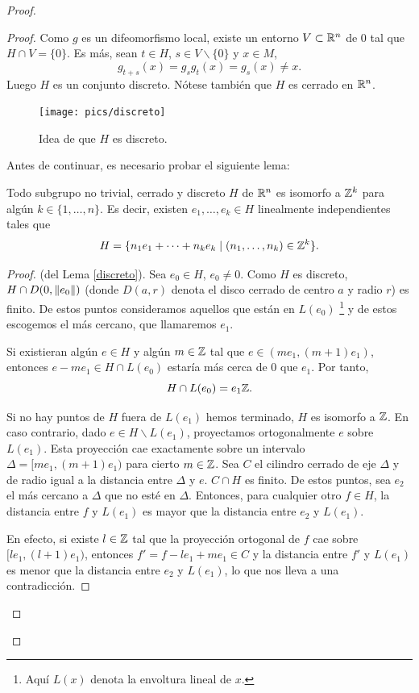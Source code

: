 \begin{proof}
\begin{proof}
 Como $g$ es un difeomorfismo local, existe un entorno $V\subset \mathbb{R}^n$ de 0 tal que $H\cap V= \{0\}$. Es más, sean $t\in H$, $s\in V\backslash \{0\}$ y $x\in M$, 
  \[
    g_{t+s}(x)=g_sg_t(x)=g_s(x)\neq x.
  \]
  Luego $H$ es un conjunto discreto. Nótese también que $H$ es cerrado en $\mathbb{R}^n$.
  \begin{figure}[h]
    \centering
    \texttt{[image: pics/discreto]}
    \caption{\small Idea de que $H$ es discreto.}
    \label{fig:discreto}
  \end{figure}

  Antes de continuar, es necesario probar el siguiente lema:
  \begin{lema}\label{discreto}
    Todo subgrupo no trivial, cerrado y discreto $H$ de $\mathbb{R}^n$ es isomorfo a $\mathbb{Z}^k$ para algún $k\in\{1,\dots,n\}$. Es decir, existen $e_1,\dots,e_k \in H$ linealmente independientes tales que 
    \[
      H=\{n_1e_1+\cdots+n_ke_k \mid (n_1,\dots,n_k) \in \mathbb{Z}^k \}.
    \]
  \end{lema}
  \begin{proof}(del Lema \ref{discreto}). 
  Sea $e_0 \in H$, $e_0 \neq 0$. Como $H$ es discreto, $H \cap D(0,\left\Vert e_0\right\Vert)$ (donde $D(a,r)$ denota el disco cerrado de centro $a$ y radio $r$) es finito. De estos puntos consideramos aquellos que están en $L(e_0)$ \footnote{Aquí $L(x)$ denota la envoltura lineal de $x$.} y de estos escogemos el más cercano, que llamaremos $e_1$. 
  
  Si existieran algún $e \in H$ y algún $m \in \mathbb{Z}$ tal que $e \in (me_1,(m+1)e_1)$, entonces $e-me_1 \in H \cap L(e_0)$ estaría más cerca de 0 que $e_1$. Por tanto, 
  \[
    H\cap L(e_0) = e_1\mathbb{Z}.
  \]

  Si no hay puntos de $H$ fuera de $L(e_1)$ hemos terminado, $H$ es isomorfo a $\mathbb{Z}$. En caso contrario, dado $e \in H \backslash L(e_1)$, proyectamos ortogonalmente $e$ sobre $L(e_1)$. Esta proyección cae exactamente sobre un intervalo $\Delta=[me_1,(m+1)e_1)$ para cierto $m \in \mathbb{Z}$. Sea $C$ el cilindro cerrado de eje $\Delta$ y de radio igual a la distancia entre $\Delta$ y $e$. $C\cap H$ es finito. De estos puntos, sea $e_2$ el más cercano a $\Delta$ que no esté en $\Delta$. Entonces, para cualquier otro $f \in H$, la distancia entre $f$ y $L(e_1)$ es mayor que la distancia entre $e_2$ y $L(e_1)$. 
    
    En efecto, si existe $l \in \mathbb{Z}$ tal que la proyección ortogonal de $f$ cae sobre $[le_1,(l+1)e_1)$, entonces $f'=f-le_1+me_1 \in C$ y la distancia entre $f'$ y $L(e_1)$ es menor que la distancia entre $e_2$ y $L(e_1)$, lo que nos lleva a una contradicción.


\end{proof}
\end{proof}
\end{proof}
